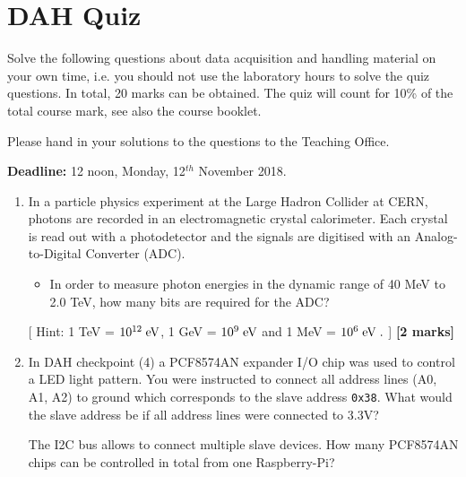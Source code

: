 \chapter{DAH Quiz}
\label{sec:quiz}

Solve the following questions about data acquisition and handling material on your own time,
i.e. you should not use the laboratory hours to solve the quiz questions. 
In total, 20 marks can be obtained.
The quiz will count for 10\% of the total course mark, see also the course booklet. 

Please hand in your solutions to the questions to the Teaching Office.

{\bf Deadline:} 12 noon, Monday, 12$^{th}$ November 2018.

\begin{enumerate}

\item  In a particle physics experiment at the Large Hadron Collider at CERN, photons  are recorded in an electromagnetic crystal calorimeter. Each crystal is read out with a photodetector and the signals
are  digitised with an Analog-to-Digital Converter (ADC).
%
\begin{itemize}
\item In order to measure photon  energies  in  the dynamic range of 40 MeV to  2.0 TeV,
how many bits are required for the ADC? 
\end{itemize}
[ Hint: 1 TeV = $10^{12}\; \rm eV$, 1 GeV = $10^9\; \rm eV$ and 1 MeV = $10^6\; \rm eV\; .$ ]
%
\hfill {\bf [2 marks]}\\

\item In DAH checkpoint (4) a PCF8574AN expander I/O chip was used to control a LED light pattern.  You were instructed to connect all address lines (A0, A1, A2) to ground which corresponds to the slave address {\tt 0x38}. What would the slave address be  if all address lines were connected to 3.3V? 

The I2C bus allows to connect multiple slave devices. How many PCF8574AN chips can be controlled in total from one Raspberry-Pi?


\end{enumerate}
